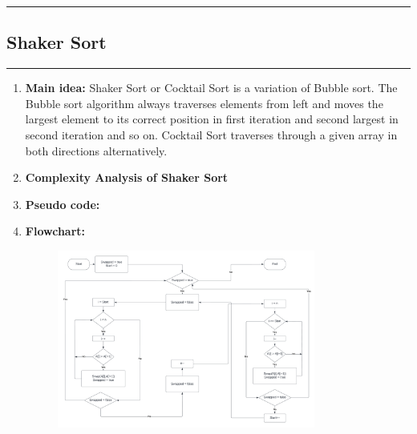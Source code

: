 \documentclass[11pt,a4paper]{article}
\begin{document}
{		\rule{15cm}{0.1cm}
		\subsection{Shaker Sort}
		\rule{15cm}{0.1cm}
			\begin{enumerate}[label=\textbf{\arabic*})]
				\item \textbf{Main idea:}
				Shaker Sort or Cocktail Sort is a variation of Bubble sort. The Bubble sort algorithm always traverses elements from left and moves the largest element to its correct position in first iteration and second largest in second iteration and so on. Cocktail Sort traverses through a given array in both directions alternatively. 
				\\[12pt]
				\item \textbf{Complexity Analysis of Shaker Sort}
				\\[12pt]
				\item \textbf{Pseudo code:} 
				\pagebreak
				\item \textbf{Flowchart:}
					\begin{figure}[H]
						\centering 
						\includegraphics[width=0.8\textwidth]{Shaker Sort}
					\end{figure}
					

\end{enumerate}}
\end{document}
